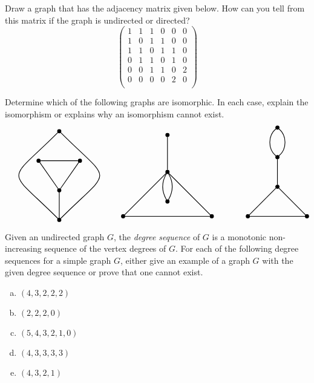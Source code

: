 \documentclass[11pt,letterpaper]{article}
\begin{document}
\newpage





 Draw a graph that has the adjacency matrix given below. How can you tell from this matrix if the graph is undirected or directed? 
	\[
	\begin{pmatrix}
	1 & 1 & 1 & 0 & 0 & 0 \\
	1 & 0 & 1 & 1 & 0 & 0 \\
	1 & 1 & 0 & 1 & 1 & 0 \\
	0 & 1 & 1 & 0 & 1 & 0 \\
	0 & 0 & 1 & 1 & 0 & 2 \\
	0 & 0 & 0 & 0 & 2 & 0 \\
	\end{pmatrix}
	\] \pspace





\newpage





 Determine which of the following graphs are isomorphic. In each case, explain the isomorphism or explains why an isomorphism cannot exist. \pspace
	\[
	\graphThree \quad \graphFour \qquad\qquad \graphFive
	\]





\newpage





 Given an undirected graph $G$, the \textit{degree sequence} of $G$ is a monotonic non-increasing sequence of the vertex degrees of $G$. For each of the following degree sequences for a simple graph $G$, either give an example of a graph $G$ with the given degree sequence or prove that one cannot exist.
	\begin{enumerate}[(a)]
	\item $(4, 3, 2, 2, 2)$
	\item $(2, 2, 2, 0)$
	\item $(5, 4, 3, 2, 1, 0)$ 
	\item $(4, 3, 3, 3, 3)$
	\item $(4, 3, 2, 1)$
	\end{enumerate} \pspace





\newpage
\end{document}
